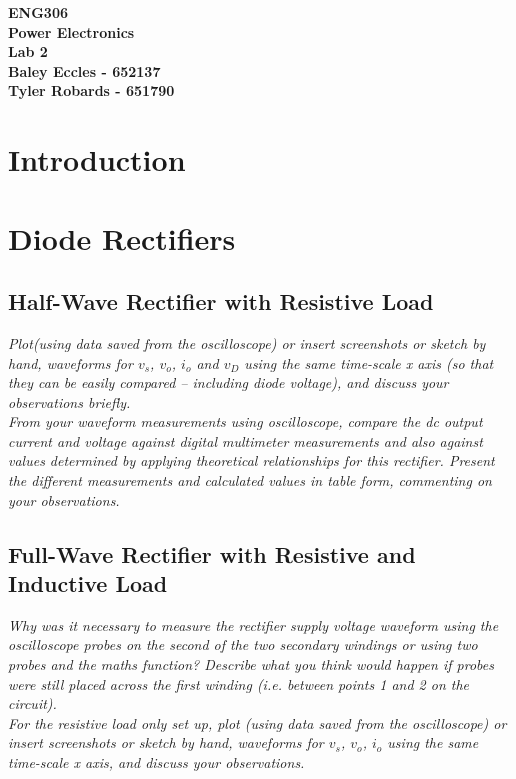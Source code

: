 \documentclass[12pt,a4paper]{article}
\begin{document}
\begin{center}
\textbf{\LARGE ENG306\\[6pt]
Power Electronics}\\[10pt]
\textbf{\large Lab 2\\[4pt]
Baley Eccles - 652137\\
Tyler Robards - 651790}\\
\end{center}

\tableofcontents
\newpage
\section{Introduction}

\section{Diode Rectifiers}
\subsection{Half-Wave Rectifier with Resistive Load}
\textit{Plot(using data saved from the oscilloscope) or insert screenshots or sketch by hand, waveforms for $v_s$, $v_o$, $i_o$ and $v_D$ using the same time-scale x axis (so that they can be easily compared – including diode voltage), and discuss your observations briefly.}\\

\textit{From your waveform measurements using oscilloscope, compare the dc output current and voltage against digital multimeter measurements and also against values determined by applying theoretical relationships for this rectifier. Present the different measurements and calculated values in table form, commenting on your observations.}\\


\subsection{Full-Wave Rectifier with Resistive and Inductive Load}
\textit{Why was it necessary to measure the rectifier supply voltage waveform using the oscilloscope
probes on the second of the two secondary windings or using two probes and the maths function?
Describe what you think would happen if probes were still placed across the first winding (i.e.
between points 1 and 2 on the circuit).}\\

\textit{For the resistive load only set up, plot (using data saved from the oscilloscope) or insert screenshots
or sketch by hand, waveforms for $v_s$, $v_o$, $i_o$ using the same time-scale x axis, and discuss your
observations.}\\
\end{document}
